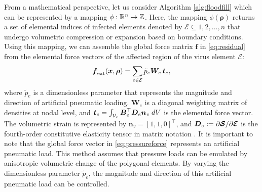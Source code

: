 From a mathematical perspective, let us consider Algorithm \ref{alg:floodfill} which can be represented by a mapping $\phi: \mathbb{R}^n \mapsto {\mathbb{Z}}$. Here, the mapping $\phi(\boldsymbol{\rho})$ returns a set of elemental indices of infected elements denoted by $\mathcal{E} \subseteq {1,2,...,n}$ that undergo volumetric compression or expansion based on boundary conditions. Using this mapping, we can assemble the global force matrix $\boldsymbol{f}$ in \eqref{eq:residual} from the elemental force vectors of the affected region of the virus element $\mathcal{E}$:
%
\begin{equation}
{\boldsymbol{f}}_{\textrm{ext}}(\boldsymbol{x},\boldsymbol{\rho}) = \sum_{e \in \mathcal{E}} \tilde{p}_e \boldsymbol{W}_{\!e} \, \boldsymbol{t}_{e}, \label{eq:pressureforce}
\end{equation}
%
where $\tilde{p}_e$ is a dimensionless parameter that represents the magnitude and direction of artificial pneumatic loading. $\boldsymbol{W}_{\!e}$ is a diagonal weighting matrix of densities at nodal level, and $\boldsymbol{t}_e = \int_{\mathcal{V}_e} {\boldsymbol{B}}_e^\top {\boldsymbol{D}}_e {\boldsymbol{n}}_v \; dV$ is the elemental force vector. The volumetric strain is represented by $\boldsymbol{n}_{v} = [1,1,0]^\top$, and $\boldsymbol{D}_e := \partial \boldsymbol{\mathcal{S}}/\partial \boldsymbol{\mathcal{E}}$ is the fourth-order constitutive elasticity tensor in matrix notation \cite{Renaud2011}. It is important to note that the global force vector in \eqref{eq:pressureforce} represents an artificial pneumatic load. This method assumes that pressure loads can be emulated by anisotropic volumetric change of the polygonal elements. By varying the dimensionless parameter $\tilde{p}_e$, the magnitude and direction of this artificial pneumatic load can be controlled.

